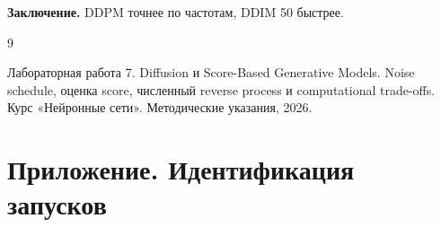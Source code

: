 \noindent\textbf{Заключение.} DDPM точнее по частотам, DDIM 50 быстрее.
\clearpage
\renewcommand{\refname}{Список использованных источников}
\begin{thebibliography}{9}
 Лабораторная работа 7. Diffusion и Score-Based Generative Models. Noise schedule, оценка score, численный reverse process и computational trade-offs. Курс «Нейронные сети». Методические указания, 2026.
\end{thebibliography}
\clearpage
\section*{Приложение. Идентификация запусков}
\begingroup\small{}
